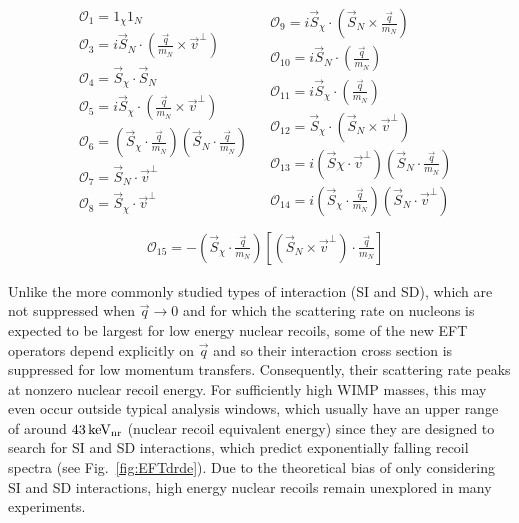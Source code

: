 \begingroup
\belowdisplayskip=0pt
\begin{align*}
\begin{split} 
&\mathcal{O}_1 = 1_{\chi} 1_N  \\
&\mathcal{O}_3 = i\vec{S}_N\cdot (\frac{\vec{q}}{m_N}\times\vec{v}^\perp) \\
&\mathcal{O}_4 = \vec{S}_{\chi}\cdot \vec{S}_N \\
&\mathcal{O}_5 = i\vec{S}_{\chi}\cdot (\frac{\vec{q}}{m_N}\times\vec{v}^\perp) \\
&\mathcal{O}_6 = (\vec{S}_{\chi} \cdot \frac{\vec{q}}{m_N})(\vec{S}_N \cdot \frac{\vec{q}}{m_N}) \\
&\mathcal{O}_7 = \vec{S}_N \cdot \vec{v}^\perp \\
&\mathcal{O}_8 = \vec{S}_{\chi} \cdot \vec{v}^\perp  \\
\end{split}
\begin{split}
&\mathcal{O}_9 = i\vec{S}_{\chi} \cdot(\vec{S}_N \times \frac{\vec{q}}{m_N}) \\
&\mathcal{O}_{10} = i\vec{S}_N \cdot (\frac{\vec{q}}{m_N}) \\
&\mathcal{O}_{11} = i\vec{S}_{\chi} \cdot (\frac{\vec{q}}{m_N}) \\
&\mathcal{O}_{12} = \vec{S}_\chi \cdot (\vec{S}_N \times \vec{v}^\perp) \\
&\mathcal{O}_{13} = i(\vec{S}\chi \cdot \vec{v}^\perp)(\vec{S}_N \cdot \frac{\vec{q}}{m_N})\\
&\mathcal{O}_{14} = i(\vec{S}_\chi \cdot \frac{\vec{q}}{m_N})(\vec{S}_N \cdot \vec{v}^\perp) \\
\end{split}
\end{align*}
\endgroup
\begingroup
\abovedisplayskip=0pt
\begin{align}
&\mathcal{O}_{15} = -(\vec{S}_\chi \cdot \frac{\vec{q}}{m_N})\left[(\vec{S}_N \times \vec{v}^\perp)\cdot \frac{\vec{q}}{m_N}\right]
\label{eq:OpDef}
\end{align}
\endgroup

Unlike the more commonly studied types of interaction (SI and SD), which are not suppressed when $\vec{q} \rightarrow 0$ and for which the scattering rate on nucleons is expected to be largest for low energy nuclear recoils, some of the new EFT operators depend explicitly on $\vec{q}$ and so their interaction cross section is suppressed for low momentum transfers. Consequently, their scattering rate peaks at nonzero nuclear recoil energy. For sufficiently high WIMP masses, this may even occur outside typical analysis windows, which usually have an upper range of around $ 43\,\mathrm{keV_\mathrm{nr}}$ (nuclear recoil equivalent
energy) since they are designed to search for SI and SD interactions, which predict exponentially falling recoil spectra (see Fig.~\ref{fig:EFTdrde}). Due to the theoretical bias of only considering SI and SD interactions, high energy nuclear recoils remain unexplored in many experiments.

